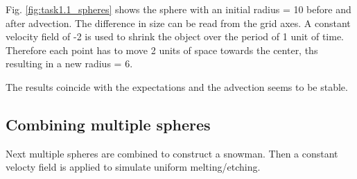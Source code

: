 Fig. \ref{fig:task1.1_spheres} shows the sphere with an initial radius = 10 before and after advection. 
The difference in size can be read from the grid axes. A constant velocity field of -2 is used to shrink the object over the period of 1 unit of time. 
Therefore each point has to move 2 units of space towards the center, ths resulting in a new radius = 6.

The results coincide with the expectations and the advection seems to be stable.

\subsection{Combining multiple spheres}
Next multiple spheres are combined to construct a snowman. 
Then a constant velocty field is applied to simulate uniform melting/etching.

